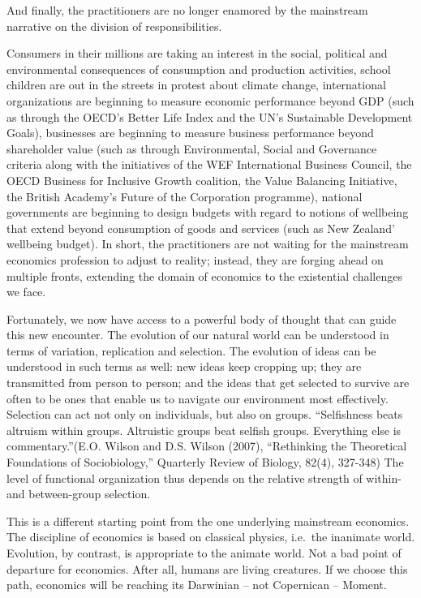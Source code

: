 \documentclass[
]{book}
\begin{document}
And finally, the practitioners are no longer enamored by the mainstream narrative on the division of responsibilities.

Consumers in their millions are taking an interest in the social, political and environmental consequences of consumption and production activities, school children are out in the streets in protest about climate change, international organizations are beginning to measure economic performance beyond GDP (such as through the OECD's Better Life Index and the UN's Sustainable Development Goals), businesses are beginning to measure business performance beyond shareholder value (such as through Environmental, Social and Governance criteria along with the initiatives of the WEF International Business Council, the OECD Business for Inclusive Growth coalition, the Value Balancing Initiative, the British Academy's Future of the Corporation programme), national governments are beginning to design budgets with regard to notions of wellbeing that extend beyond consumption of goods and services (such as New Zealand' wellbeing budget). In short, the practitioners are not waiting for the mainstream economics profession to adjust to reality; instead, they are forging ahead on multiple fronts, extending the domain of economics to the existential challenges we face.

Fortunately, we now have access to a powerful body of thought that can guide this new encounter. The evolution of our natural world can be understood in terms of variation, replication and selection. The evolution of ideas can be understood in such terms as well: new ideas keep cropping up; they are transmitted from person to person; and the ideas that get selected to survive are often to be ones that enable us to navigate our environment most effectively. Selection can act not only on individuals, but also on groups. ``Selfishness beats altruism within groups. Altruistic groups beat selfish groups. Everything else is commentary.''(E.O. Wilson and D.S. Wilson (2007), ``Rethinking the Theoretical Foundations of Sociobiology,'' Quarterly Review of Biology, 82(4), 327-348) The level of functional organization thus depends on the relative strength of within- and between-group selection.

This is a different starting point from the one underlying mainstream economics. The discipline of economics is based on classical physics, i.e.~the inanimate world. Evolution, by contrast, is appropriate to the animate world. Not a bad point of departure for economics. After all, humans are living creatures. If we choose this path, economics will be reaching its Darwinian -- not Copernican -- Moment.
\end{document}
